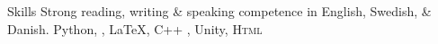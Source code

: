 
\begin{rubric}{Skills}
\entry*[Languages]
	Strong reading, writing \& speaking competence in English, Swedish, \& Danish.
	Python, , \LaTeX, C++ , Unity, \textsc{Html}
\entry*[Databases]
\end{rubric}
